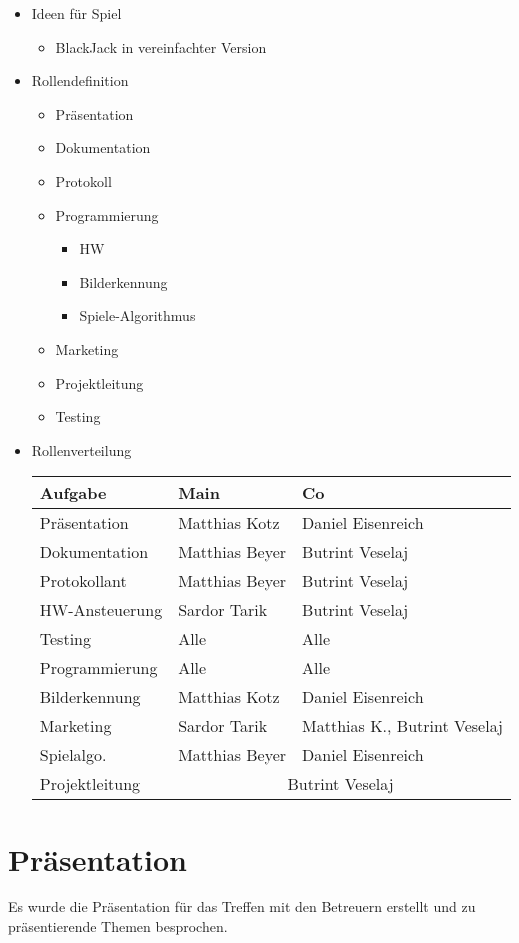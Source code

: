 \documentclass[a4paper,DIV=9,12pt]{scrreprt}
\begin{document}
    \begin{itemize}
        \item Ideen für Spiel
            \begin{itemize}
                \item BlackJack in vereinfachter Version
            \end{itemize}

        \item Rollendefinition
            \begin{itemize}
                \item Präsentation
                \item Dokumentation
                \item Protokoll
                \item Programmierung
                    \begin{itemize}
                        \item HW
                        \item Bilderkennung
                        \item Spiele-Algorithmus
                    \end{itemize}
                \item Marketing
                \item Projektleitung
                \item Testing
            \end{itemize}
        \item Rollenverteilung

            \begin{tabular}{l | l l}
                Aufgabe & Main & Co \\
                \hline
                Präsentation    & Matthias Kotz     & Daniel Eisenreich \\
                Dokumentation   & Matthias Beyer    & Butrint Veselaj \\
                Protokollant    & Matthias Beyer    & Butrint Veselaj \\
                HW-Ansteuerung  & Sardor Tarik      & Butrint Veselaj \\
                Testing         & Alle              & Alle \\
                Programmierung  & Alle              & Alle \\
                Bilderkennung   & Matthias Kotz     & Daniel Eisenreich \\
                Marketing       & Sardor Tarik      & Matthias K., Butrint Veselaj \\
                Spielalgo.      & Matthias Beyer    & Daniel Eisenreich \\
                Projektleitung  & \multicolumn{2}{c}{Butrint Veselaj} \\
            \end{tabular}

    \end{itemize}

\chapter{Präsentation}

    Es wurde die Präsentation für das Treffen mit den Betreuern erstellt und zu
    präsentierende Themen besprochen.
\end{document}
